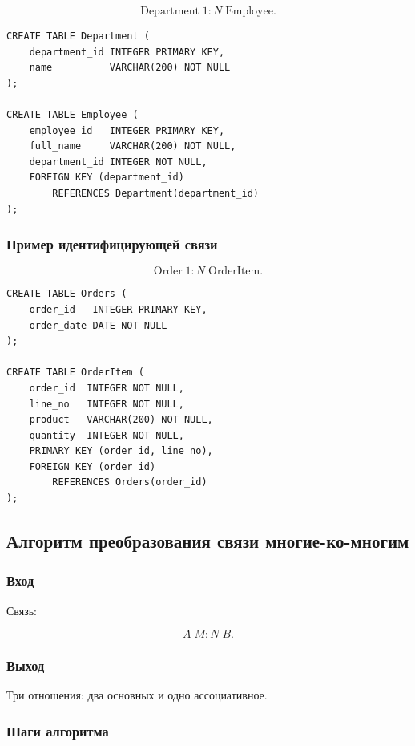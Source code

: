 \documentclass[12pt,a4paper]{article}
\theoremstyle{remark}
\begin{document}
\[
    \text{Department} \; 1 : N \; \text{Employee}.
\]

\begin{verbatim}
CREATE TABLE Department (
    department_id INTEGER PRIMARY KEY,
    name          VARCHAR(200) NOT NULL
);

CREATE TABLE Employee (
    employee_id   INTEGER PRIMARY KEY,
    full_name     VARCHAR(200) NOT NULL,
    department_id INTEGER NOT NULL,
    FOREIGN KEY (department_id)
        REFERENCES Department(department_id)
);
\end{verbatim}

\subsubsection*{Пример идентифицирующей связи}

\[
    \text{Order} \; 1 : N \; \text{OrderItem}.
\]

\begin{verbatim}
CREATE TABLE Orders (
    order_id   INTEGER PRIMARY KEY,
    order_date DATE NOT NULL
);

CREATE TABLE OrderItem (
    order_id  INTEGER NOT NULL,
    line_no   INTEGER NOT NULL,
    product   VARCHAR(200) NOT NULL,
    quantity  INTEGER NOT NULL,
    PRIMARY KEY (order_id, line_no),
    FOREIGN KEY (order_id)
        REFERENCES Orders(order_id)
);
\end{verbatim}

\subsection{Алгоритм преобразования связи многие-ко-многим}

\subsubsection*{Вход}

Связь:

\[
    A \; M : N \; B.
\]

\subsubsection*{Выход}

Три отношения: два основных и одно ассоциативное.

\subsubsection*{Шаги алгоритма}
\end{document}
